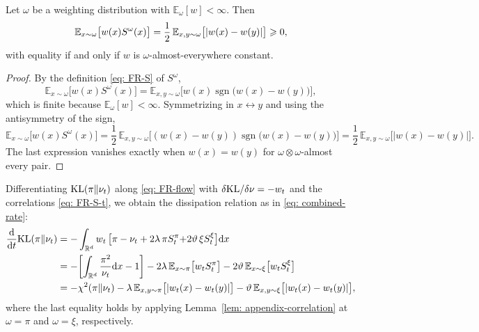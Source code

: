 \documentclass{article}
\begin{document}
\begin{lemma}
\label{lem: appendix-correlation}
Let $\omega$ be a weighting distribution with $\mathbb E_{\omega}[w]<\infty$. Then
\begin{equation}
    \mathbb E_{x\sim\omega}\bigl[w(x)S^{\omega}(x)\bigr]
    = \frac12\,\mathbb E_{x,y\sim\omega}\bigl[|w(x)-w(y)|\bigr] \geqslant 0 ,
    \label{eq: appendix-correlation}
\end{equation}
with equality if and only if $w$ is $\omega$-almost-everywhere constant.
\end{lemma}

\begin{proof}
By the definition \eqref{eq: FR-S} of $S^{\omega}$,
\begin{equation*}
    \mathbb E_{x\sim\omega}\bigl[w(x)S^{\omega}(x)\bigr]
    = \mathbb E_{x,y\sim\omega}\bigl[w(x)\operatorname{sgn}\bigl(w(x)-w(y)\bigr)\bigr] ,
\end{equation*}
which is finite because $\mathbb E_\omega[w]<\infty$. Symmetrizing in $x\leftrightarrow y$ and using the antisymmetry of the sign,
\begin{equation*}
    \mathbb E_{x\sim\omega}\bigl[w(x)S^{\omega}(x)\bigr]
    = \frac12\,\mathbb E_{x,y\sim\omega}\bigl[(w(x)-w(y))\operatorname{sgn}\bigl(w(x)-w(y)\bigr)\bigr]
    = \frac12\,\mathbb E_{x,y\sim\omega}\bigl[|w(x)-w(y)|\bigr] .
\end{equation*}
The last expression vanishes exactly when $w(x)=w(y)$ for $\omega\otimes\omega$-almost every pair.
\end{proof}

Differentiating $\mathrm{KL}(\pi\|\nu_t)$ along \eqref{eq: FR-flow} with $\delta\mathrm{KL}/\delta\nu = -w_t$ and the correlations \eqref{eq: FR-S-t}, we obtain the dissipation relation as in \eqref{eq: combined-rate}:
\begin{align*}
    \frac{\mathrm{d}}{\mathrm{d} t}\mathrm{KL}(\pi\|\nu_t)
    &= -\int_{\mathbb R^d} w_t\,\bigl[\pi-\nu_t+2\lambda\,\pi S^{\pi}_t{+2\vartheta\,\xi S^{\xi}_t}\bigr]\mathrm{d} x \\
    &= -\biggl[\int_{\mathbb R^d}\frac{\pi^2}{\nu_t}\mathrm{d} x - 1\biggr]
       - 2\lambda\,\mathbb E_{x\sim\pi}\bigl[w_t S^{\pi}_t\bigr]
       - 2\vartheta\,\mathbb E_{x\sim\xi}\bigl[w_t S^{\xi}_t\bigr] \\
    & = -\chi^2(\pi\|\nu_t) - \lambda\,\mathbb E_{x,y\sim\pi}\bigl[|w_t(x)-w_t(y)|\bigr]
    - \vartheta\,\mathbb E_{x,y\sim\xi}\bigl[|w_t(x)-w_t(y)|\bigr],
\end{align*}
where the last equality holds by applying Lemma~\ref{lem: appendix-correlation} at $\omega = \pi$ and $\omega = \xi$, respectively.
\end{document}
